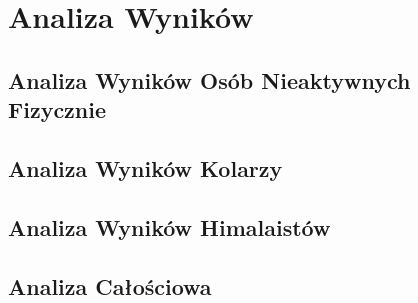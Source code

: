 \chapter{Analiza Wyników}
\section{Analiza Wyników Osób Nieaktywnych Fizycznie}
\section{Analiza Wyników Kolarzy}
\section{Analiza Wyników Himalaistów}
\section{Analiza Całościowa}